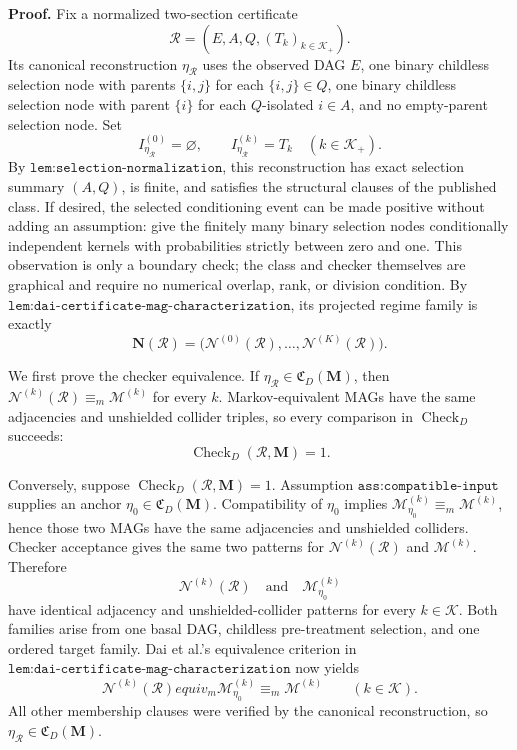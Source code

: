 \textbf{Proof.}
Fix a normalized two-section certificate
\[
\mathcal R=(E,A,Q,(T_k)_{k\in\mathcal K_+}).
\]
Its canonical reconstruction \(\eta_{\mathcal R}\) uses the observed DAG \(E\), one binary childless selection node with parents \(\{i,j\}\) for each \(\{i,j\}\in Q\), one binary childless selection node with parent \(\{i\}\) for each \(Q\)-isolated \(i\in A\), and no empty-parent selection node.  Set
\[
I_{\eta_{\mathcal R}}^{(0)}=\varnothing,
\qquad
I_{\eta_{\mathcal R}}^{(k)}=T_k
\quad(k\in\mathcal K_+).
\]
By \(\texttt{lem:selection-normalization}\), this reconstruction has exact selection summary \((A,Q)\), is finite, and satisfies the structural clauses of the published class.  If desired, the selected conditioning event can be made positive without adding an assumption: give the finitely many binary selection nodes conditionally independent kernels with probabilities strictly between zero and one.  This observation is only a boundary check; the class and checker themselves are graphical and require no numerical overlap, rank, or division condition.  By \(\texttt{lem:dai-certificate-mag-characterization}\), its projected regime family is exactly
\[
\mathbf N(\mathcal R)
=\bigl(\mathcal N^{(0)}(\mathcal R),\ldots,\mathcal N^{(K)}(\mathcal R)\bigr).
\]

We first prove the checker equivalence.  If \(\eta_{\mathcal R}\in\mathfrak C_D(\mathbf M)\), then \(\mathcal N^{(k)}(\mathcal R)\equiv_m\mathcal M^{(k)}\) for every \(k\).  Markov-equivalent MAGs have the same adjacencies and unshielded collider triples, so every comparison in \(\operatorname{Check}_{D}\) succeeds:
\[
\operatorname{Check}_{D}(\mathcal R,\mathbf M)=1.
\]

Conversely, suppose \(\operatorname{Check}_{D}(\mathcal R,\mathbf M)=1\).  Assumption \(\texttt{ass:compatible-input}\) supplies an anchor \(\eta_0\in\mathfrak C_D(\mathbf M)\).  Compatibility of \(\eta_0\) implies
\(\mathcal M_{\eta_0}^{(k)}\equiv_m\mathcal M^{(k)}\), hence those two MAGs have the same adjacencies and unshielded colliders.  Checker acceptance gives the same two patterns for \(\mathcal N^{(k)}(\mathcal R)\) and \(\mathcal M^{(k)}\).  Therefore
\[
\mathcal N^{(k)}(\mathcal R)
\quad\text{and}\quad
\mathcal M_{\eta_0}^{(k)}
\]
have identical adjacency and unshielded-collider patterns for every \(k\in\mathcal K\).  Both families arise from one basal DAG, childless pre-treatment selection, and one ordered target family.  Dai et al.'s equivalence criterion in \(\texttt{lem:dai-certificate-mag-characterization}\) now yields
\[
\mathcal N^{(k)}(\mathcal R)equiv_m\mathcal M_{\eta_0}^{(k)}
\equiv_m\mathcal M^{(k)}
\qquad(k\in\mathcal K).
\]
All other membership clauses were verified by the canonical reconstruction, so \(\eta_{\mathcal R}\in\mathfrak C_D(\mathbf M)\).

